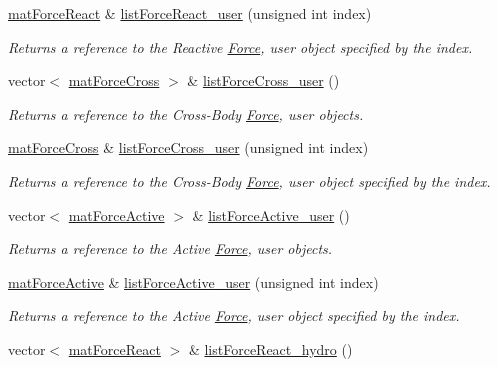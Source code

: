 \begin{DoxyCompactItemize}
\hyperlink{classmat_force_react}{mat\-Force\-React} \& \hyperlink{classmat_body_a53cbb789ae423084375b024954bf21f0}{list\-Force\-React\-\_\-user} (unsigned int index)
\begin{DoxyCompactList}\small\item\em Returns a reference to the Reactive \hyperlink{class_force}{Force}, user object specified by the index. \end{DoxyCompactList}\item 
vector$<$ \hyperlink{classmat_force_cross}{mat\-Force\-Cross} $>$ \& \hyperlink{classmat_body_a5dc37a8bb5143f2034ef6491969b2abe}{list\-Force\-Cross\-\_\-user} ()
\begin{DoxyCompactList}\small\item\em Returns a reference to the Cross-\/\-Body \hyperlink{class_force}{Force}, user objects. \end{DoxyCompactList}\item 
\hyperlink{classmat_force_cross}{mat\-Force\-Cross} \& \hyperlink{classmat_body_ae508a1904283a46d1fc5893da4080630}{list\-Force\-Cross\-\_\-user} (unsigned int index)
\begin{DoxyCompactList}\small\item\em Returns a reference to the Cross-\/\-Body \hyperlink{class_force}{Force}, user object specified by the index. \end{DoxyCompactList}\item 
vector$<$ \hyperlink{classmat_force_active}{mat\-Force\-Active} $>$ \& \hyperlink{classmat_body_a6a51e55baec56037eee824ec53af9b5d}{list\-Force\-Active\-\_\-user} ()
\begin{DoxyCompactList}\small\item\em Returns a reference to the Active \hyperlink{class_force}{Force}, user objects. \end{DoxyCompactList}\item 
\hyperlink{classmat_force_active}{mat\-Force\-Active} \& \hyperlink{classmat_body_a7d79de764dd75ad606a1cc9346b58676}{list\-Force\-Active\-\_\-user} (unsigned int index)
\begin{DoxyCompactList}\small\item\em Returns a reference to the Active \hyperlink{class_force}{Force}, user object specified by the index. \end{DoxyCompactList}\item 
vector$<$ \hyperlink{classmat_force_react}{mat\-Force\-React} $>$ \& \hyperlink{classmat_body_abead59c1604f4581a977e086874b2e7a}{list\-Force\-React\-\_\-hydro} ()

\end{DoxyCompactItemize}
